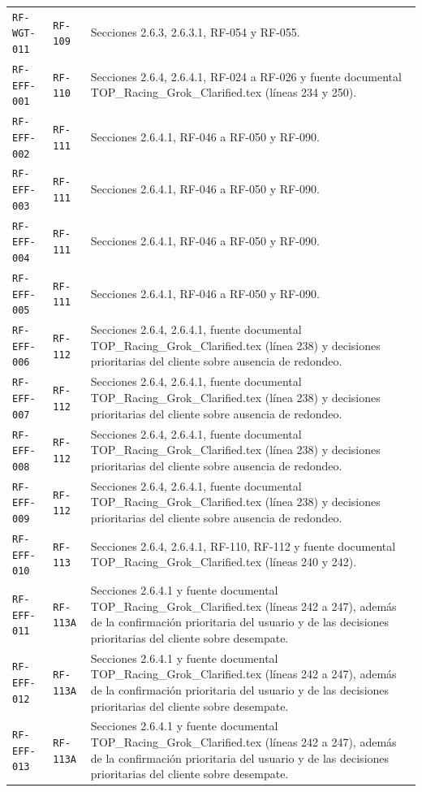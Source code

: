 \documentclass[10pt,letterpaper]{article}
\begin{document}
\begin{landscape}
\begin{longtable}{P{2.7cm}P{2.6cm}P{15.7cm}}
\texttt{RF-WGT-011} & \texttt{RF-109} & Secciones 2.6.3, 2.6.3.1, RF-054 y RF-055.\\
\texttt{RF-EFF-001} & \texttt{RF-110} & Secciones 2.6.4, 2.6.4.1, RF-024 a RF-026 y fuente documental TOP\_Racing\_Grok\_Clarified.tex (líneas 234 y 250).\\
\texttt{RF-EFF-002} & \texttt{RF-111} & Secciones 2.6.4.1, RF-046 a RF-050 y RF-090.\\
\texttt{RF-EFF-003} & \texttt{RF-111} & Secciones 2.6.4.1, RF-046 a RF-050 y RF-090.\\
\texttt{RF-EFF-004} & \texttt{RF-111} & Secciones 2.6.4.1, RF-046 a RF-050 y RF-090.\\
\texttt{RF-EFF-005} & \texttt{RF-111} & Secciones 2.6.4.1, RF-046 a RF-050 y RF-090.\\
\texttt{RF-EFF-006} & \texttt{RF-112} & Secciones 2.6.4, 2.6.4.1, fuente documental TOP\_Racing\_Grok\_Clarified.tex (línea 238) y decisiones prioritarias del cliente sobre ausencia de redondeo.\\
\texttt{RF-EFF-007} & \texttt{RF-112} & Secciones 2.6.4, 2.6.4.1, fuente documental TOP\_Racing\_Grok\_Clarified.tex (línea 238) y decisiones prioritarias del cliente sobre ausencia de redondeo.\\
\texttt{RF-EFF-008} & \texttt{RF-112} & Secciones 2.6.4, 2.6.4.1, fuente documental TOP\_Racing\_Grok\_Clarified.tex (línea 238) y decisiones prioritarias del cliente sobre ausencia de redondeo.\\
\texttt{RF-EFF-009} & \texttt{RF-112} & Secciones 2.6.4, 2.6.4.1, fuente documental TOP\_Racing\_Grok\_Clarified.tex (línea 238) y decisiones prioritarias del cliente sobre ausencia de redondeo.\\
\texttt{RF-EFF-010} & \texttt{RF-113} & Secciones 2.6.4, 2.6.4.1, RF-110, RF-112 y fuente documental TOP\_Racing\_Grok\_Clarified.tex (líneas 240 y 242).\\
\texttt{RF-EFF-011} & \texttt{RF-113A} & Secciones 2.6.4.1 y fuente documental TOP\_Racing\_Grok\_Clarified.tex (líneas 242 a 247), además de la confirmación prioritaria del usuario y de las decisiones prioritarias del cliente sobre desempate.\\
\texttt{RF-EFF-012} & \texttt{RF-113A} & Secciones 2.6.4.1 y fuente documental TOP\_Racing\_Grok\_Clarified.tex (líneas 242 a 247), además de la confirmación prioritaria del usuario y de las decisiones prioritarias del cliente sobre desempate.\\
\texttt{RF-EFF-013} & \texttt{RF-113A} & Secciones 2.6.4.1 y fuente documental TOP\_Racing\_Grok\_Clarified.tex (líneas 242 a 247), además de la confirmación prioritaria del usuario y de las decisiones prioritarias del cliente sobre desempate.\\

\end{longtable}
\end{landscape}
\end{document}
